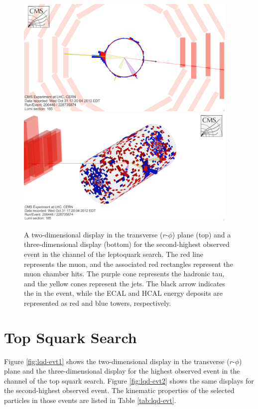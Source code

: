 \begin{figure}[hbtp]
\begin{center}
\includegraphics[width=0.95\textwidth]{figures/eventdisplays/LQ_evt2_rphi.png}
\includegraphics[width=0.95\textwidth]{figures/eventdisplays/LQ_evt2_3D.png}
\caption{A two-dimensional display in the transverse ($r$-$\phi$) plane (top) and a three-dimensional display (bottom) for the second-highest \ST observed event in the \mutau channel of the leptoquark search. The red line represents the muon, and the associated red rectangles represent the muon chamber hits. The purple cone represents the hadronic tau, and the yellow cones represent the jets. The black arrow indicates the \met in the event, while the ECAL and HCAL energy deposits are represented as red and blue towers, respectively. }
\label{fig:lq-evt2}
\end{center}
\end{figure}

\clearpage

\section{Top Squark Search}

Figure \ref{fig:lqd-evt1} shows the two-dimensional display in the transverse ($r$-$\phi$) plane and the three-dimensional display for the highest \ST observed event in the \mutau channel of the top squark search. Figure \ref{fig:lqd-evt2} shows the same displays for the second-highest \ST observed event. The kinematic properties of the selected particles in those events are listed in Table \ref{tab:lqd-evt}.

